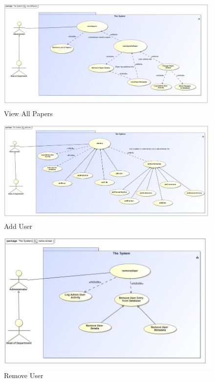 \documentclass[a4paper,12pt]{article}
\begin{document}
\begin{figure}[H]
    \centering
    \caption{View All Papers}
    \includegraphics[width=1\textwidth]{req-func/uc__The_System__viewAllPapers.jpg}
\end{figure}

\begin{figure}[H]
    \centering
    \caption{Add User}
    \includegraphics[width=1\textwidth]{req-func/uc__The_System__addUser.jpg}
\end{figure}

\begin{figure}[H]
    \centering
    \caption{Remove User}
    \includegraphics[width=1\textwidth]{req-func/uc__The_System__removeUser.jpg}
\end{figure}
\end{document}
